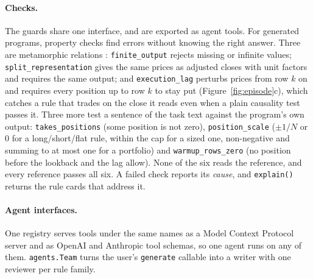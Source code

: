 \paragraph{Checks.}
The \NGuards{} guards share one interface, and \NGuardsExported{} are exported as agent tools.
For generated programs, \FixVisibleChecks{} property checks find errors without knowing the
right answer. Three are metamorphic relations \citep{segura2016metamorphic}:
\texttt{finite\_output} rejects missing or infinite values; \texttt{split\_representation} gives
the same prices as adjusted closes with unit factors and requires the same output; and
\texttt{execution\_lag} perturbs prices from row $k$ on and requires every position up to row
$k$ to stay put (Figure~\ref{fig:episode}c), which catches a rule that trades on the close it
reads even when a plain causality test passes it. Three more test a sentence of the task text
against the program's own output: \texttt{takes\_positions} (some position is not zero),
\texttt{position\_scale} ($\pm1/N$ or 0 for a long/short/flat rule, within the cap for a sized
one, non-negative and summing to at most one for a portfolio) and \texttt{warmup\_rows\_zero}
(no position before the lookback and the lag allow). None of the six reads the reference, and
every reference passes all six. A failed check reports its \emph{cause}, and \texttt{explain()}
returns the rule cards that address it.

\paragraph{Agent interfaces.}
One registry serves \NTools{} tools under the same names as a Model Context Protocol server
\citep{mcp2026spec} and as OpenAI and Anthropic tool schemas, so one agent runs on any of them.
\texttt{agents.Team} turns the user's \texttt{generate} callable into a writer with one reviewer
per rule family.
